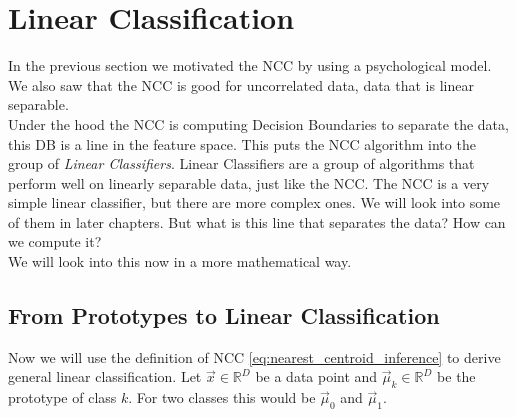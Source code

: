 \section{Linear Classification}
In the previous section we motivated the NCC by using a psychological model. We also saw that the NCC is good for uncorrelated data, data that is linear separable.\\
Under the hood the NCC is computing Decision Boundaries to separate the data, this DB is a line in the feature space.
This puts the NCC algorithm into the group of \textit{Linear Classifiers}. Linear Classifiers are a group of algorithms that perform well on linearly separable data, just like the NCC.
The NCC is a very simple linear classifier, but there are more complex ones. We will look into some of them in later chapters.
But what is this line that separates the data? How can we compute it?\\
We will look into this now in a more mathematical way.
\subsection{From Prototypes to Linear Classification}
Now we will use the definition of NCC \eqref{eq:nearest_centroid_inference} to derive general linear classification.
Let $\vec{x} \in \mathbb{R}^D$ be a data point and $\vec{\mu}_k \in \mathbb{R}^D$ be the prototype of class $k$. For two classes this would be $\vec{\mu}_0$ and $\vec{\mu}_1$.

